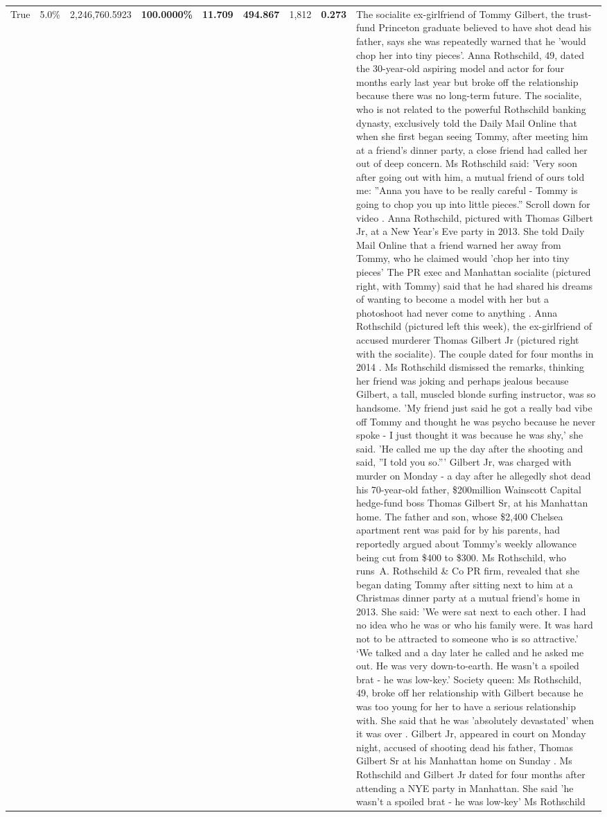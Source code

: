 \begin{table}[H]
\begin{tabular}{lllrlllll}
True & 5.0\% & 2,246,760.5923 & \bfseries \color{red} 100.0000\% & \bfseries \color{red} 11.709 & \bfseries \color{red} 494.867 & 1,812 & \bfseries \color{red} 0.273 & The socialite ex-girlfriend of Tommy Gilbert, the trust-fund Princeton graduate believed to have shot dead his father, says she was repeatedly warned that he 'would chop her into tiny pieces'. Anna Rothschild, 49, dated the 30-year-old aspiring model and actor for four months early last year but broke off the relationship because there was no long-term future. The socialite, who is not related to the powerful Rothschild banking dynasty, exclusively told the Daily Mail Online that when she first began seeing Tommy, after meeting him at a friend's dinner party, a close friend had called her out of deep concern. Ms Rothschild said: 'Very soon after going out with him, a mutual friend of ours told me: ''Anna you have to be really careful - Tommy is going to chop you up into little pieces.'' Scroll down for video . Anna Rothschild, pictured with Thomas Gilbert Jr, at a New Year's Eve party in 2013. She told Daily Mail Online that a friend warned her away from Tommy, who he claimed would 'chop her into tiny pieces' The PR exec and Manhattan socialite (pictured right, with Tommy) said that he had shared his dreams of wanting to become a model with her but a photoshoot had never come to anything . Anna Rothschild (pictured left this week), the ex-girlfriend of accused murderer Thomas Gilbert Jr (pictured right with the socialite). The couple dated for four months in 2014 . Ms Rothschild dismissed the remarks, thinking her friend was joking and perhaps jealous because Gilbert, a tall, muscled blonde surfing instructor, was so handsome. 'My friend just said he got a really bad vibe off Tommy and thought he was psycho because he never spoke - I just thought it was because he was shy,' she said. 'He called me up the day after the shooting and said, ''I told you so.''' Gilbert Jr, was charged with murder on Monday - a day after he allegedly shot dead his 70-year-old father, \$200million Wainscott Capital hedge-fund boss Thomas Gilbert Sr, at his Manhattan home. The father and son, whose \$2,400 Chelsea apartment rent was paid for by his parents, had reportedly argued about Tommy's weekly allowance being cut from \$400 to \$300. Ms Rothschild, who runs A. Rothschild \& Co PR firm, revealed that she began dating Tommy after sitting next to him at a Christmas dinner party at a mutual friend's home in 2013. She said: 'We were sat next to each other. I had no idea who he was or who his family were. It was hard not to be attracted to someone who is so attractive.' ‘We talked and a day later he called and he asked me out. He was very down-to-earth. He wasn’t a spoiled brat - he was low-key.’ Society queen: Ms Rothschild, 49, broke off her relationship with Gilbert because he was too young for her to have a serious relationship with. She said that he was 'absolutely devastated' when it was over . Gilbert Jr, appeared in court on Monday night, accused of shooting dead his father, Thomas Gilbert Sr at his Manhattan home on Sunday . Ms Rothschild and Gilbert Jr dated for four months after attending a NYE party in Manhattan. She said 'he wasn't a spoiled brat - he was low-key' Ms Rothschild 
\end{tabular}
\end{table}
